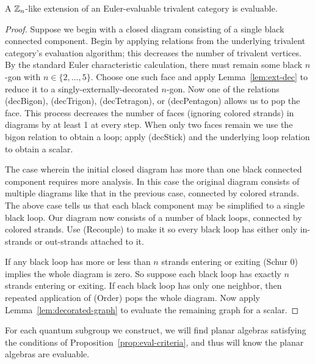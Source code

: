 \begin{proposition}\label{prop:eval-criteria}
    A $\mathbb{Z}_n$-like extension of an Euler-evaluable trivalent category is evaluable.
\end{proposition}

\begin{proof}
    Suppose we begin with a closed diagram consisting of a single black connected component.
    Begin by applying relations from the underlying trivalent category's evaluation algorithm; this decreases the number of trivalent vertices.
    By the standard Euler characteristic calculation, there must remain some black $n$-gon with $n\in\{ 2,\dots,5 \}$.
    Choose one such face and apply Lemma~\ref{lem:ext-dec} to reduce it to a singly-externally-decorated $n$-gon.
    Now one of the relations (decBigon), (decTrigon), (decTetragon), or (decPentagon) allows us to pop the face.
    This process decreases the number of faces (ignoring colored strands) in diagrams by at least 1 at every step.
    When only two faces remain we use the bigon relation to obtain a loop; apply (decStick) and the underlying loop relation to obtain a scalar.
    
    The case wherein the initial closed diagram has more than one black connected component requires more analysis.
    In this case the original diagram consists of multiple diagrams like that in the previous case, connected by colored strands.
    The above case tells us that each black component may be simplified to a single black loop.
    Our diagram now consists of a number of black loops, connected by colored strands.
    Use (Recouple) to make it so every black loop has either only in-strands or out-strands attached to it.
    
    If any black loop has more or less than $n$ strands entering or exiting (Schur 0) implies the whole diagram is zero.
    So suppose each black loop has exactly $n$ strands entering or exiting.
    If each black loop has only one neighbor, then repeated application of (Order) pops the whole diagram.
    Now apply Lemma~\ref{lem:decorated-graph} to evaluate the remaining graph for a scalar.
\end{proof}

For each quantum subgroup we construct, we will find planar algebras satisfying the conditions of Proposition~\ref{prop:eval-criteria}, and thus will know the planar algebras are evaluable. 



